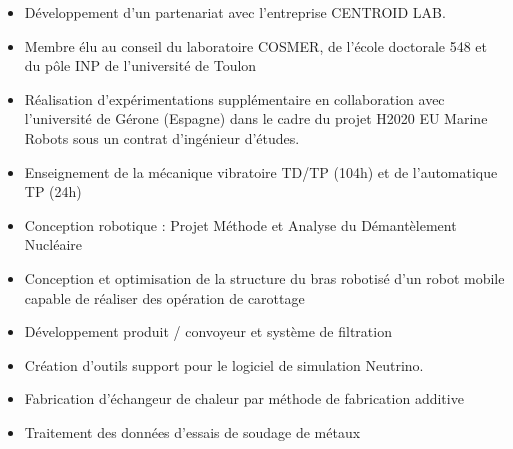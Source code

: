 \documentclass[10pt,a4paper,ragged2e,withhyper]{altacv}
\begin{document}
\begin{paracol}{2}
            \begin{itemize}
                \item Développement d'un partenariat avec l'entreprise CENTROID LAB.
                \item Membre élu au conseil du laboratoire COSMER, de l'école doctorale 548 et du pôle INP de l'université de Toulon
                \item Réalisation d'expérimentations supplémentaire en collaboration avec l'université de Gérone (Espagne) dans le cadre du projet H2020 EU Marine Robots sous un contrat d'ingénieur d'études.
                \item Enseignement de la mécanique vibratoire TD/TP (104h) et de l'automatique TP (24h)
            \end{itemize}
            
            \divider
            
            \begin{itemize}
                \item Conception robotique : Projet Méthode et Analyse du Démantèlement Nucléaire
                \item Conception et optimisation de la structure du bras robotisé d'un robot mobile capable de réaliser des opération de carottage
            \end{itemize}
            
            \divider
            
            \begin{itemize}
                \item Développement produit / convoyeur et système de filtration
                \item Création d'outils support pour le logiciel de simulation Neutrino.
            \end{itemize}
            
            \divider
            
            \begin{itemize}
                \item Fabrication d'échangeur de chaleur par méthode de fabrication additive
                \item Traitement des données d'essais de soudage de métaux
            \end{itemize}
            

\end{paracol}
\end{document}
